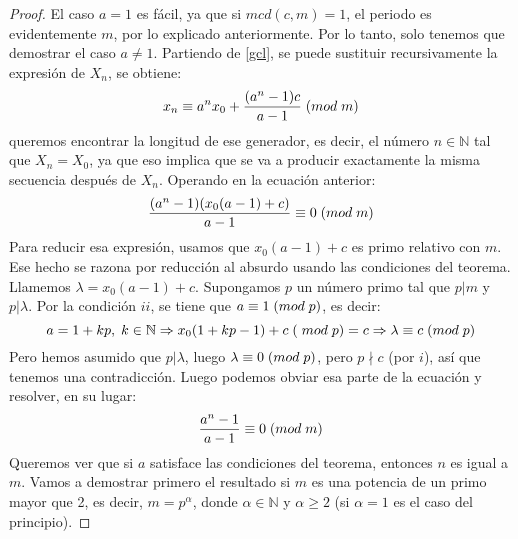\begin{proof}
El caso $a=1$ es fácil, ya que si $mcd(c,m)=1$, el periodo es evidentemente $m$, por lo explicado anteriormente. Por lo tanto, solo tenemos que demostrar el caso $a\neq 1$. Partiendo de \eqref{gcl}, se puede sustituir recursivamente la expresión de $X_n$, se obtiene:
\[
x_n \equiv a^nx_0+\frac{(a^n-1)c}{a-1} \;(mod \; m)
\]
queremos encontrar la longitud de ese generador, es decir, el número $n\in\mathbb{N}$ tal que $X_n=X_0$, ya que eso implica que se va a producir exactamente la misma secuencia después de $X_n$. Operando en la ecuación anterior:
\[
\frac{(a^n-1)(x_0(a-1)+c)}{a-1} \equiv 0 \;(mod \; m)
\]
Para reducir esa expresión, usamos que $x_0(a-1)+c$ es primo relativo con $m$. Ese hecho se razona por reducción al absurdo usando las condiciones del teorema. Llamemos $\lambda=x_0(a-1)+c$. Supongamos $p$ un número primo tal que $p|m$ y $p|\lambda$. Por la condición $ii$, se tiene que $a \equiv 1 \;(mod \; p)$, es decir:
\[
a = 1+kp, \;k\in\mathbb{N} \Rightarrow x_0(1+kp-1)+c\;(\;mod\;p) = c \Rightarrow \lambda \equiv c \;(mod \; p)
\]
Pero hemos asumido que $p|\lambda$, luego $\lambda \equiv 0 \;(mod \; p)$, pero $p\nmid c$ (por $i$), así que tenemos una contradicción. Luego podemos obviar esa parte de la ecuación y resolver, en su lugar:
\begin{equation}\label{eq:gcl2}
\frac{a^n-1}{a-1} \equiv 0 \;(mod \; m)
\end{equation}
Queremos ver que si $a$ satisface las condiciones del teorema, entonces $n$ es igual a $m$. Vamos a demostrar primero el resultado si $m$ es una potencia de un primo mayor que 2, es decir, $m=p^\alpha$, donde $\alpha\in\mathbb{N}$ y $\alpha\geq 2$ (si $\alpha=1$ es el caso del principio).


\end{proof}

